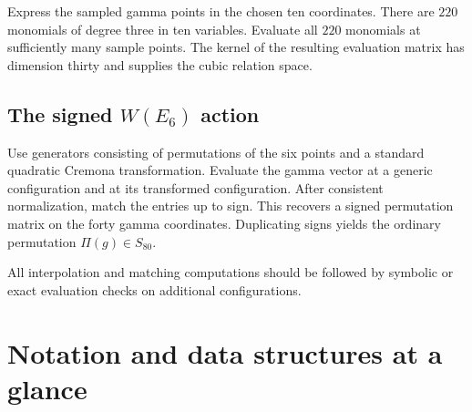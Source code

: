 \documentclass[11pt]{article}
\begin{document}
Express the sampled gamma points in the chosen ten coordinates.  There are
$220$ monomials of degree three in ten variables.  Evaluate all $220$
monomials at sufficiently many sample points.  The kernel of the resulting
evaluation matrix has dimension thirty and supplies the cubic relation
space.

\subsection{The signed $W(E_6)$ action}

Use generators consisting of permutations of the six points and a standard
quadratic Cremona transformation.  Evaluate the gamma vector at a generic
configuration and at its transformed configuration.  After consistent
normalization, match the entries up to sign.  This recovers a signed
permutation matrix on the forty gamma coordinates.  Duplicating signs yields
the ordinary permutation $\Pi(g)\in S_{80}$.

All interpolation and matching computations should be followed by symbolic
or exact evaluation checks on additional configurations.

\section{Notation and data structures at a glance}
\end{document}
